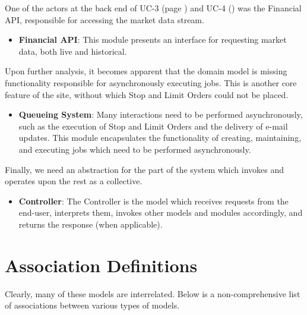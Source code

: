 One of the actors at the back end of UC-3 (page \pageref{UC-3}) and UC-4
(\pageref{UC-4}) was the Financial API, responsible for accessing the 
market data stream. 

\begin{itemize}
\item \textbf{Financial API}: This module presents an interface for requesting market
data, both live and historical. 
\end{itemize}

Upon further analysis, it becomes apparent that the domain model is missing
functionality responsible for asynchronously executing jobs. This is another
core feature of the site, without which Stop and Limit Orders could not 
be placed.

\begin{itemize}
\item \textbf{Queueing System}: Many interactions need to be performed asynchronously,
such as the execution of Stop and Limit Orders and the delivery of e-mail 
updates. This module encapsulates the functionality of creating, maintaining,
and executing jobs which need to be performed asynchronously.
\end{itemize}

Finally, we need an abstraction for the part of the system which invokes and operates
upon the rest as a collective.

\begin{itemize}
\item \textbf{Controller}: The Controller is the model which receives requests from 
the end-user, interprets them, invokes other models and modules accordingly, and 
returns the response (when applicable).
\end{itemize}


\section{Association Definitions}

Clearly, many of these models are interrelated. Below is a non-comprehensive
list of associations between various types of models.

